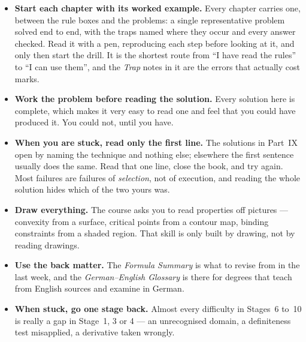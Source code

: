 \begin{itemize}[leftmargin=1.6em,itemsep=0.4ex]
  \item \textbf{Start each chapter with its worked example.} Every chapter
        carries one, between the rule boxes and the problems: a single
        representative problem solved end to end, with the traps named where
        they occur and every answer checked. Read it with a pen, reproducing
        each step before looking at it, and only then start the drill. It is
        the shortest route from ``I have read the rules'' to ``I can use
        them'', and the \emph{Trap} notes in it are the errors that actually
        cost marks.
  \item \textbf{Work the problem before reading the solution.} Every
        solution here is complete, which makes it very easy to read one and
        feel that you could have produced it. You could not, until you have.
  \item \textbf{When you are stuck, read only the first line.} The solutions
        in Part~IX open by naming the technique and nothing else; elsewhere
        the first sentence usually does the same. Read that one line, close
        the book, and try again. Most failures are failures of
        \emph{selection}, not of execution, and reading the whole solution
        hides which of the two yours was.
  \item \textbf{Draw everything.} The course asks you to read properties off
        pictures --- convexity from a surface, critical points from a
        contour map, binding constraints from a shaded region. That skill is
        only built by drawing, not by reading drawings.
  \item \textbf{Use the back matter.} The \emph{Formula Summary} is what to
        revise from in the last week, and the \emph{German--English
        Glossary} is there for degrees that teach from English sources and
        examine in German.
  \item \textbf{When stuck, go one stage back.} Almost every difficulty in
        Stages~6 to~10 is really a gap in Stage~1, 3 or 4 --- an
        unrecognised domain, a definiteness test misapplied, a derivative
        taken wrongly.
\end{itemize}
